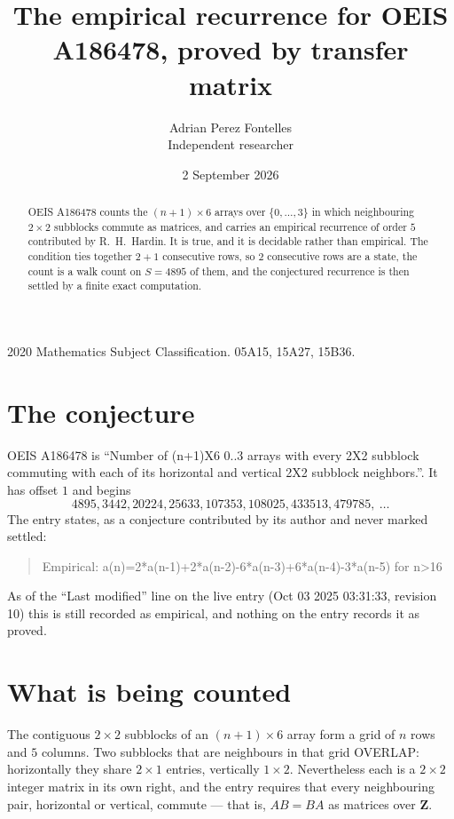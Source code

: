 \documentclass[11pt,a4paper]{article}
\title{The empirical recurrence for OEIS A186478, proved by transfer matrix}
\author{Adrian Perez Fontelles\\ \small Independent researcher}
\date{2 September 2026}
\theoremstyle{plain}
\theoremstyle{definition}
\begin{document}
\maketitle

\begin{abstract}
OEIS A186478 counts the $(n+1)\times6$ arrays over $\{0,\dots,3\}$ in which
neighbouring $2\times2$ subblocks commute as matrices, and carries an empirical
recurrence
of order $5$ contributed by R.~H.~Hardin. It is true, and it is decidable rather than
empirical. The condition ties together $2+1$ consecutive rows, so $2$ consecutive rows are
a state, the count is a walk count on $S=4895$ of them, and the conjectured recurrence is then
settled by a finite exact computation.
\end{abstract}

\noindent\small 2020 Mathematics Subject Classification. 05A15, 15A27, 15B36.\normalsize

\section{The conjecture}

OEIS A186478 is ``Number of (n+1)X6 0..3 arrays with every 2X2 subblock commuting with each of its horizontal and vertical 2X2 subblock neighbors.''. It has offset $1$ and begins
\[
4895, 3442, 20224, 25633, 107353, 108025, 433513, 479785,\ \dots
\]
The entry states, as a conjecture contributed by its author and never marked settled:
\begin{quote}
Empirical: a(n)=2*a(n-1)+2*a(n-2)-6*a(n-3)+6*a(n-4)-3*a(n-5) for n>16
\end{quote}
As of the ``Last modified'' line on the live entry (Oct 03 2025 03:31:33, revision 10) this is still
recorded as empirical, and nothing on the entry records it as proved.

\section{What is being counted}

The contiguous $2\times2$ subblocks of an $(n+1)\times6$ array form a grid of $n$
rows and $5$ columns. Two subblocks that are neighbours in that
grid OVERLAP: horizontally they share $2\times1$ entries, vertically
$1\times2$. Nevertheless each is a $2\times2$ integer matrix in its own right, and
the entry requires that every neighbouring pair, horizontal or vertical, commute --- that is,
$AB=BA$ as matrices over $\mathbf{Z}$.
\end{document}
